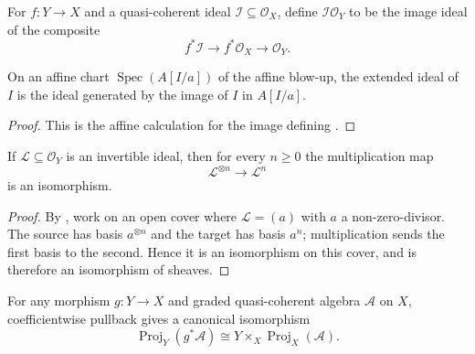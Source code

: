 \begin{definition}
  \label{def:nagata-extended-ideal}

  For $f\colon Y\to X$ and a quasi-coherent ideal
  $\mathcal I\subseteq\mathcal O_X$, define
  $\mathcal I\mathcal O_Y$ to be the image ideal of the composite
  \[
    f^*\mathcal I\longrightarrow f^*\mathcal O_X
      \longrightarrow\mathcal O_Y.
  \]
\end{definition}

\begin{lemma}
  \label{lemma:nagata-extended-ideal-affine-chart}

  On an affine chart $\operatorname{Spec}(A[I/a])$ of the affine blow-up, the
  extended ideal of $I$ is the ideal generated by the image of $I$ in
  $A[I/a]$.
\end{lemma}

\begin{proof}
  This is the affine calculation for the image defining
  .
\end{proof}

\begin{lemma}
  \label{lemma:nagata-invertible-ideal-tensor-power}

  If $\mathcal L\subseteq\mathcal O_Y$ is an invertible ideal, then for every
  $n\geq0$ the multiplication map
  \[
    \mathcal L^{\otimes n}\longrightarrow\mathcal L^n
  \]
  is an isomorphism.
\end{lemma}

\begin{proof}
  By , work on an
  open cover where $\mathcal L=(a)$ with $a$ a non-zero-divisor.  The source
  has basis $a^{\otimes n}$ and the target has basis $a^n$; multiplication
  sends the first basis to the second.  Hence it is an isomorphism on this
  cover, and is therefore an isomorphism of sheaves.
\end{proof}

\begin{lemma}
  \label{lemma:nagata-relative-proj-base-change-arbitrary}

  For any morphism $g\colon Y\to X$ and graded quasi-coherent algebra
  $\mathcal A$ on $X$, coefficientwise pullback gives a canonical isomorphism
  \[
    \operatorname{Proj}_Y(g^*\mathcal A)
      \cong Y\times_X\operatorname{Proj}_X(\mathcal A).
  \]
\end{lemma}


